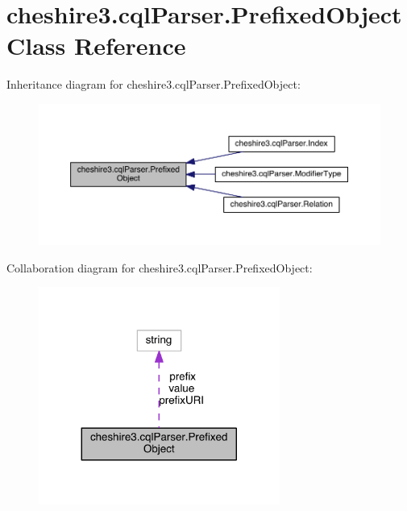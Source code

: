 \hypertarget{classcheshire3_1_1cql_parser_1_1_prefixed_object}{\section{cheshire3.\-cql\-Parser.\-Prefixed\-Object Class Reference}
\label{classcheshire3_1_1cql_parser_1_1_prefixed_object}
}


Inheritance diagram for cheshire3.\-cql\-Parser.\-Prefixed\-Object\-:
\nopagebreak
\begin{figure}[H]
\begin{center}
\leavevmode
\includegraphics[width=350pt]{classcheshire3_1_1cql_parser_1_1_prefixed_object__inherit__graph}
\end{center}
\end{figure}


Collaboration diagram for cheshire3.\-cql\-Parser.\-Prefixed\-Object\-:
\nopagebreak
\begin{figure}[H]
\begin{center}
\leavevmode
\includegraphics[width=224pt]{classcheshire3_1_1cql_parser_1_1_prefixed_object__coll__graph}
\end{center}
\end{figure}
